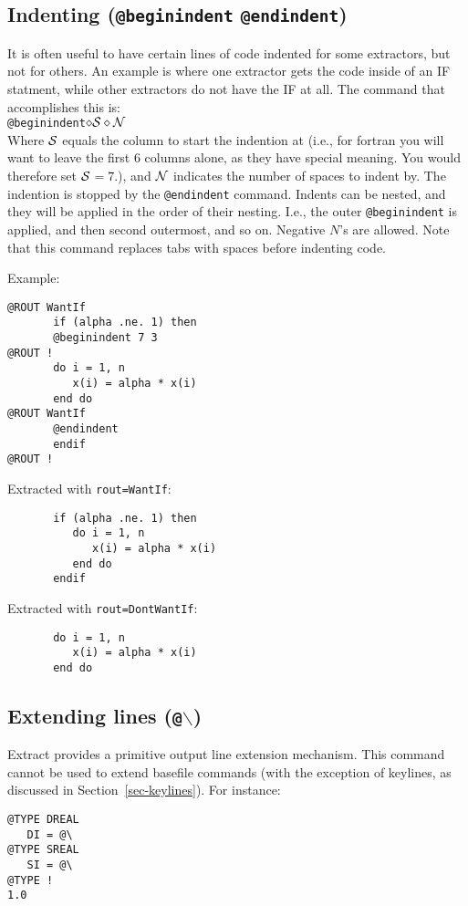 \subsection{Indenting ({\tt @beginindent} {\tt @endindent})}
\label{sec-indent}
It is often useful to have certain lines of code indented for some
extractors, but not for others.  An example is where one extractor
gets the code inside of an IF statment, while other extractors do
not have the IF at all.  The command that accomplishes this is:\\
{\tt @beginindent$\diamond\cal S\diamond N$}\\
Where $\cal S$ equals the column to start the indention at (i.e., for
fortran you will want to leave the first 6 columns alone, as they have
special meaning.  You would therefore set $\cal S$$= 7$.), and
$\cal N$ indicates the number of spaces to indent by.  The indention
is stopped by the {\tt @endindent} command.  Indents can be nested, and they
will be applied in the order of their nesting.  I.e., the outer 
{\tt @beginindent} is applied, and then second outermost, and so on.
Negative {\tt $N$}'s are allowed.
Note that this command replaces tabs with spaces before indenting code.

\noindent
Example:
\begin{verbatim}
@ROUT WantIf
       if (alpha .ne. 1) then
       @beginindent 7 3
@ROUT !
       do i = 1, n
          x(i) = alpha * x(i)
       end do
@ROUT WantIf
       @endindent
       endif
@ROUT !
\end{verbatim}

\noindent
Extracted with {\tt rout=WantIf}:
\begin{verbatim}
       if (alpha .ne. 1) then
          do i = 1, n
             x(i) = alpha * x(i)
          end do
       endif
\end{verbatim}

Extracted with {\tt rout=DontWantIf}:
\begin{verbatim}
       do i = 1, n
          x(i) = alpha * x(i)
       end do
\end{verbatim}

\subsection{Extending lines ({\tt @$\backslash$})}
Extract provides a primitive output line extension mechanism.  This command
cannot be used to extend basefile commands (with the exception of keylines,
as discussed in Section~\ref{sec-keylines}).  For instance:
\begin{verbatim}
@TYPE DREAL
   DI = @\
@TYPE SREAL
   SI = @\
@TYPE !
1.0
\end{verbatim}

